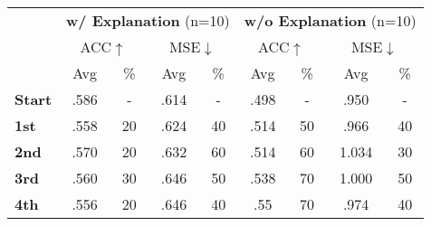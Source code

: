 \begin{table}[t]
    \centering
    \begin{threeparttable}
    \begin{tabular}{l|c|c|c|c|c|c|c|c}
        \hline
         & \multicolumn{4}{c|}{\textbf{w/ Explanation} \tiny{(n=10)}} & \multicolumn{4}{c}{\textbf{w/o Explanation} \tiny{(n=10)}} \\
         \cmidrule(lr){2-5} \cmidrule(lr){6-9}
         & \multicolumn{2}{c|}{ACC$\uparrow$} & \multicolumn{2}{c|}{MSE$\downarrow$}& \multicolumn{2}{c|}{ACC$\uparrow$} & \multicolumn{2}{c}{MSE$\downarrow$}\\
         \cmidrule(lr){2-3} \cmidrule(lr){4-5} \cmidrule(lr){6-7} \cmidrule(lr){8-9}
         & \multicolumn{1}{c|}{Avg} & \multicolumn{1}{c|}{\%} & \multicolumn{1}{c|}{Avg} & \multicolumn{1}{c|}{\%}& \multicolumn{1}{c|}{Avg} & \multicolumn{1}{c|}{\%}& \multicolumn{1}{c|}{Avg} & \multicolumn{1}{c}{\%}\\
         \hline
        \multicolumn{1}{l|}{\textbf{Start}}  & \multicolumn{1}{c|}{.586} & \multicolumn{1}{c|}{-}  & \multicolumn{1}{c|}{.614} & \multicolumn{1}{c|}{-}& \multicolumn{1}{c|}{.498}& \multicolumn{1}{c|}{-} & \multicolumn{1}{c|}{.950}& \multicolumn{1}{c}{-}\\
        \multicolumn{1}{l|}{\textbf{1st}}    & \multicolumn{1}{c|}{.558} & \multicolumn{1}{c|}{20} & \multicolumn{1}{c|}{.624} & \multicolumn{1}{c|}{40}& \multicolumn{1}{c|}{.514}& \multicolumn{1}{c|}{50} & \multicolumn{1}{c|}{.966} & \multicolumn{1}{c}{40}\\
        \multicolumn{1}{l|}{\textbf{2nd}}    & \multicolumn{1}{c|}{.570} & \multicolumn{1}{c|}{20} & \multicolumn{1}{c|}{.632} & \multicolumn{1}{c|}{60}& \multicolumn{1}{c|}{.514}& \multicolumn{1}{c|}{60}& \multicolumn{1}{c|}{1.034} & \multicolumn{1}{c}{30}\\
        \multicolumn{1}{l|}{\textbf{3rd}}    & \multicolumn{1}{c|}{.560} & \multicolumn{1}{c|}{30} & \multicolumn{1}{c|}{.646} & \multicolumn{1}{c|}{50}& \multicolumn{1}{c|}{.538}& \multicolumn{1}{c|}{70}& \multicolumn{1}{c|}{1.000} & \multicolumn{1}{c}{50}\\
        \multicolumn{1}{l|}{\textbf{4th}}    & \multicolumn{1}{c|}{.556} & \multicolumn{1}{c|}{20} & \multicolumn{1}{c|}{.646} & \multicolumn{1}{c|}{40}& \multicolumn{1}{c|}{.55}& \multicolumn{1}{c|}{70}& \multicolumn{1}{c|}{.974} & \multicolumn{1}{c}{40}\\

\end{tabular}
\end{threeparttable}
\end{table}
